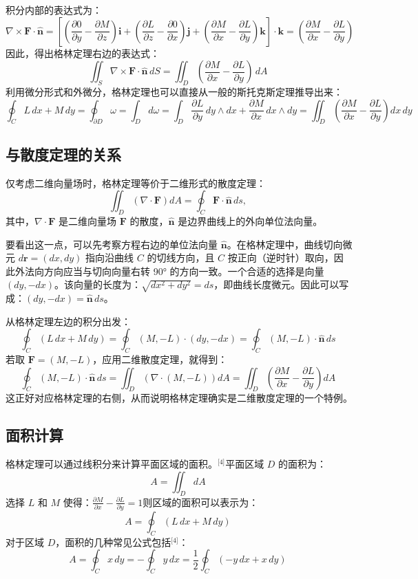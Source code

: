 积分内部的表达式为：
$$
\nabla \times \mathbf{F} \cdot \mathbf{\hat{n}}
= 
\left[
\left(\frac{\partial 0}{\partial y} - \frac{\partial M}{\partial z}\right)\mathbf{i}
+ \left(\frac{\partial L}{\partial z} - \frac{\partial 0}{\partial x}\right)\mathbf{j}
+ \left(\frac{\partial M}{\partial x} - \frac{\partial L}{\partial y}\right)\mathbf{k}
\right]
\cdot \mathbf{k}
= 
\left(\frac{\partial M}{\partial x} - \frac{\partial L}{\partial y}\right)~
$$
因此，得出格林定理右边的表达式：
$$
\iint_S \nabla \times \mathbf{F} \cdot \mathbf{\hat{n}} \, dS
= 
\iint_D 
\left(\frac{\partial M}{\partial x} - \frac{\partial L}{\partial y}\right) 
\, dA~
$$
利用微分形式和外微分，格林定理也可以直接从一般的斯托克斯定理推导出来：
$$
\oint_C L\,dx + M\,dy
= \oint_{\partial D} \omega
= \int_D d\omega
= \int_D 
\frac{\partial L}{\partial y} \, dy \wedge dx
+ \frac{\partial M}{\partial x} \, dx \wedge dy
= 
\iint_D 
\left(\frac{\partial M}{\partial x} - \frac{\partial L}{\partial y}\right)
dx\,dy~
$$
\subsection{与散度定理的关系}
仅考虑二维向量场时，格林定理等价于二维形式的散度定理：
$$
\iint_D \left(\nabla \cdot \mathbf{F} \right) dA
= 
\oint_C \mathbf{F} \cdot \mathbf{\hat{n}} \, ds,~
$$
其中，$\nabla \cdot \mathbf{F}$ 是二维向量场 $\mathbf{F}$ 的散度，$\mathbf{\hat{n}}$ 是边界曲线上的外向单位法向量。

要看出这一点，可以先考察方程右边的单位法向量 $\mathbf{\hat{n}}$。在格林定理中，曲线切向微元 $d\mathbf{r} = (dx, dy)$ 指向沿曲线 $C$ 的切线方向，且 $C$ 按正向（逆时针）取向，因此外法向方向应当与切向向量右转 90° 的方向一致。一个合适的选择是向量 $(dy, -dx)$。该向量的长度为：$\sqrt{dx^2 + dy^2} = ds$，即曲线长度微元。因此可以写成：$(dy, -dx) = \mathbf{\hat{n}} \, ds$。

从格林定理左边的积分出发：
$$
\oint_C (L\,dx + M\,dy)
=
\oint_C (M, -L) \cdot (dy, -dx)
=
\oint_C (M, -L) \cdot \mathbf{\hat{n}} \, ds~
$$
若取 $\mathbf{F} = (M, -L)$，应用二维散度定理，就得到：
$$
\oint_C (M, -L) \cdot \mathbf{\hat{n}} \, ds
=
\iint_D \left(\nabla \cdot (M, -L)\right) dA
=
\iint_D 
\left(
\frac{\partial M}{\partial x}
-
\frac{\partial L}{\partial y}
\right)
dA~
$$
这正好对应格林定理的右侧，从而说明格林定理确实是二维散度定理的一个特例。
\subsection{面积计算}
格林定理可以通过线积分来计算平面区域的面积。\(^\text{[4]}\)平面区域 $D$ 的面积为：
$$
A = \iint_D dA~
$$
选择 $L$ 和 $M$ 使得：$\frac{\partial M}{\partial x} - \frac{\partial L}{\partial y} = 1$则区域的面积可以表示为：
$$
A = \oint_C (L\,dx + M\,dy)~
$$
对于区域 $D$，面积的几种常见公式包括\(^\text{[4]}\)：
$$
A = \oint_C x\,dy
= -\oint_C y\,dx
= \frac{1}{2} \oint_C (-y\,dx + x\,dy)~
$$
